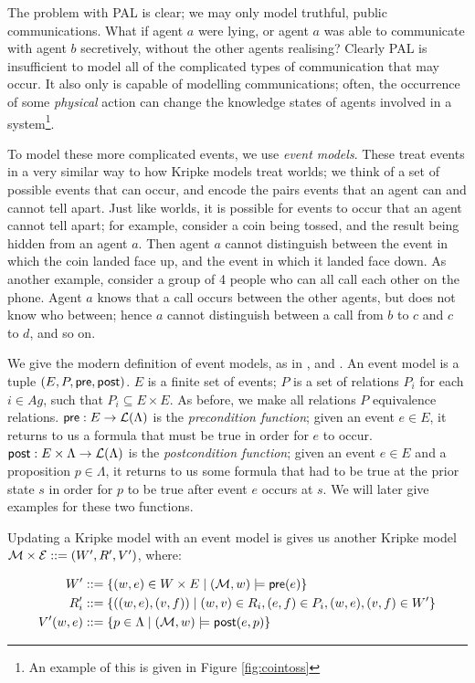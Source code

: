\documentclass[10pt, a4paper]{report}
\begin{document}
The problem with PAL is clear; we may only model truthful, public
communications. What if agent $a$ were lying, or agent $a$ was able to
communicate with agent $b$ secretively, without the other agents realising?
Clearly PAL is insufficient to model all of the complicated types of
communication that may occur. It also only is capable of modelling
communications; often, the occurrence of some \emph{physical} action can change
the knowledge states of agents involved in a system\footnote{An example of this
  is given in Figure \ref{fig:cointoss}}. 

To model these more complicated events, we use \emph{event models}. These treat
events in a very similar way to how Kripke models treat worlds; we think of a
set of possible events that can occur, and encode the pairs events that an agent
can and cannot tell apart. Just like worlds, it is possible for events to occur
that an agent cannot tell apart; for example, consider a coin being tossed, and
the result being hidden from an agent $a$. Then agent $a$ cannot distinguish
between the event in which the coin landed face up, and the event in which it
landed face down. As another example, consider a group of 4 people who can all
call each other on the phone. Agent $a$ knows that a call occurs between the
other agents, but does not know who between; hence $a$ cannot distinguish
between a call from $b$ to $c$ and $c$ to $d$, and so on.

We give the modern definition of event models, as in \cite{MalvinThesis}, and
\cite{AutomataTechniques}. An event model  is a tuple $(E, P, \textsf{pre},
\textsf{post})$. $E$ is a finite set of events; $P$ is a set of relations $P_i$ for each
$i \in Ag$, such that $P_i \subseteq E \times E$. As before, we make all
relations $P$ equivalence relations. $\textsf{pre} : E \rightarrow \mathcal{L}(\Lambda) $ is
the \emph{precondition function}; given an event $e \in E$, it returns to us a
formula that must be true in order for $e$ to occur. $\textsf{post} : E \times \Lambda
\rightarrow \mathcal{L}(\Lambda)$ is the \emph{postcondition function}; given an
event $e \in E$ and a proposition $p \in \Lambda$, it returns to us some formula
that had to be true at the prior state $s$ in order for $p$ to be true after
event $e$ occurs at $s$. We will later give examples for these two functions.

Updating a Kripke model  with an event model  is gives us another
Kripke model $\mathcal{M} \times \mathcal{E} ::= (W', R', V')$, where:

\begin{align*}
  W'   &::= \left\{(w, e) \in W \times E \mid (\mathcal{M}, w) \models \textsf{pre}(e)\right\} \\
  R_i' &::= \left\{((w, e), (v, f)) \mid (w, v) \in R_i, (e, f) \in P_i, (w, e), (v, f) \in W' \right\} \\
  V'(w, e) &::= \left\{ p \in \Lambda \mid (\mathcal{M}, w) \models \textsf{post}(e, p) \right\}
\end{align*}
\end{document}
